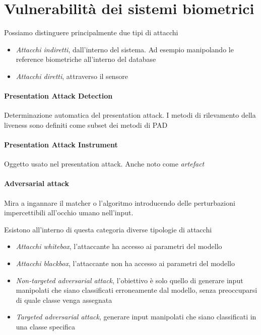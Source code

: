 \section{Vulnerabilità dei sistemi biometrici}
Possiamo distinguere principalmente due tipi di attacchi
\begin{itemize}
    \item \textit{Attacchi indiretti}, dall’interno del sistema. Ad esempio manipolando le reference biometriche all’interno del database
    \item \textit{Attacchi diretti}, attraverso il sensore
\end{itemize}

\paragraph{Presentation Attack Detection}
Determinazione automatica del presentation attack. I metodi di rilevamento della liveness sono definiti come subset dei metodi di PAD

\paragraph{Presentation Attack Instrument}
Oggetto usato nel presentation attack. Anche noto come \textit{artefact}

\paragraph{Adversarial attack}
Mira a ingannare il matcher o l'algoritmo introducendo delle perturbazioni impercettibili all'occhio umano nell'input. 

Esistono all’interno di questa categoria diverse tipologie di attacchi
\begin{itemize}
    \item \textit{Attacchi whitebox}, l’attaccante ha accesso ai parametri del modello
    \item \textit{Attacchi blackbox}, l’attaccante non ha accesso ai parametri del modello
    \item \textit{Non-targeted adversarial attack}, l'obiettivo è solo quello di generare input manipolati che siano classificati erroneamente dal modello, senza preoccuparsi di quale classe venga assegnata
    \item \textit{Targeted adversarial attack}, generare input manipolati che siano classificati in una classe specifica
\end{itemize}

